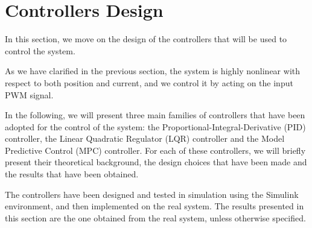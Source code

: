 \section{Controllers Design}
\label{sec:controllers_design}

In this section, we move on the design of the controllers that will be used to control the system.

As we have clarified in the previous section, the system is highly nonlinear with respect to both position and current, and we control it by acting on the input PWM signal.

In the following, we will present three main families of controllers that have been adopted for the control of the system: the Proportional-Integral-Derivative (PID) controller, the Linear Quadratic Regulator (LQR) controller and the Model Predictive Control (MPC) controller.
For each of these controllers, we will briefly present their theoretical background, the design choices that have been made and the results that have been obtained.

The controllers have been designed and tested in simulation using the Simulink environment, and then implemented on the real system.
The results presented in this section are the one obtained from the real system, unless otherwise specified.



